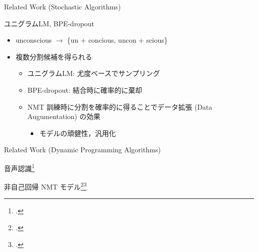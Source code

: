 \documentclass[unicode, 12pt, aspectratio=43]{beamer}
\begin{document}
\begin{frame}[label={sec:orgf51776a}]{Related Work (Stochastic Algorithms)}
\begin{block}{ユニグラムLM, BPE-dropout}
\begin{itemize}
\item \footnotesize unconscious \(\rightarrow\) \{un + concious, uncon + scious\}
\item \normalsize 複数分割候補を得られる
\begin{itemize}
\item ユニグラムLM: 尤度ベースでサンプリング
\item BPE-dropout: 結合時に確率的に棄却
\item NMT 訓練時に分割を確率的に得ることでデータ拡張 (Data Augumentation) の効果
\begin{itemize}
\item モデルの頑健性，汎用化
\end{itemize}
\end{itemize}
\end{itemize}
\end{block}
\end{frame}

\begin{frame}[label={sec:orgb050160}]{\normalsize Related Work (Dynamic Programming Algorithms)}
\begin{block}{音声認識\footcite{wang-etal-2017-sequence}}
\end{block}

\begin{block}{非自己回帰 NMT モデル\footcite{chan-etal-2020-imputer}\footcite{saharia-etal-2020-nonautoregressive}}
\end{block}
\end{frame}
\end{document}
